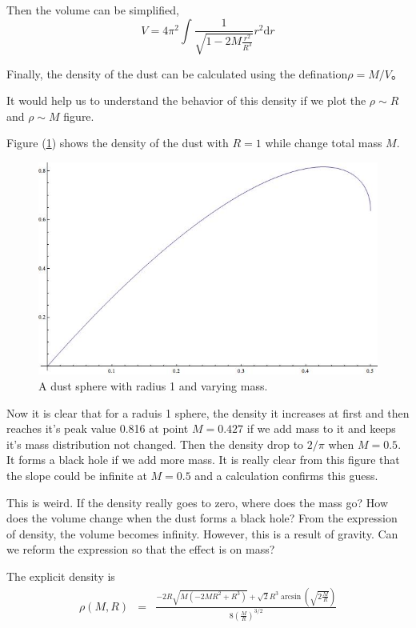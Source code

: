 \documentclass[12pt,a4paper]{article}
\begin{document}
Then the volume can be simplified,
\begin{equation}
V=4\pi^2 \int \frac{1}{\sqrt{1-2 M \frac{r^2}{R^3}}}r^2\mathrm dr
\end{equation}

Finally, the density of the dust can be calculated using the defination$\rho=M/V$。

It would help us to understand the behavior of this density if we plot the $\rho \sim R$ and $\rho \sim M$ figure.


Figure (\ref{fig:FixR}) shows the density of the dust with $R=1$ while change total mass $M$.
\begin{figure}[!htbp]
\centering
\includegraphics[width=400pt]{DustBlackHole_FixR.jpg}
\caption{A dust sphere with radius 1 and varying mass.}\label{fig:FixR}
\end{figure}

Now it is clear that for a raduis 1 sphere, the density it increases at first and then reaches it's peak value 0.816 at point $M=0.427$ if we add mass to it and keeps it's mass distribution not changed. Then the density drop to $2/\pi$ when $M=0.5$. It forms a black hole if we add more mass. It is really clear from this figure that the slope could be infinite at $M=0.5$ and a calculation confirms this guess.

This is weird. If the density really goes to zero, where does the mass go? How does the volume change when the dust forms a black hole? From the expression of density, the volume becomes infinity. However, this is a result of gravity. Can we reform the expression so that the effect is on mass?

The explicit density is
\begin{eqnarray}
\rho(M,R)&=&\frac{-2 R\sqrt{M(-2M R^2+R^3)}+\sqrt 2 R^3 \arcsin (\sqrt{2 \frac{M}{R}})}{8 (\frac{M}{R})^{3/2}}\label{eqn:densityMR}
\end{eqnarray}
\end{document}
